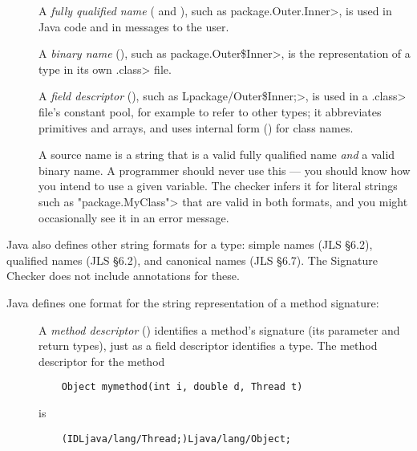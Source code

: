 \begin{description}

\item[]
  A \emph{fully qualified name} ( and ), such as
  \<package.Outer.Inner>, is used in Java code and in messages to
  the user.

\item[]
  A \emph{binary name} (), such as
  \<package.Outer\$Inner>, is
  the representation of a type in its own \<.class> file.

\item[]
  A \emph{field descriptor} (), such as
  \<Lpackage/Outer\$Inner;>, is used in a \<.class> file's constant pool,
  for example to refer to other types; it abbreviates primitives and
  arrays, and uses internal form () for class names.

\item[]
  A source name is a string that is a valid fully qualified name \emph{and}
  a valid binary name.  A programmer should never use this --- you should
  know how you intend to use a given variable.  The checker infers it for
  literal strings such as \<"package.MyClass"> that are valid in both
  formats, and you might occasionally see it in an error message.

\end{description}

Java also defines other string formats for a type: simple
names (JLS \S 6.2), qualified names (JLS \S 6.2), and canonical
names (JLS \S 6.7).  The Signature Checker does not include annotations
for these.


Java defines one format for the string representation of a method signature:

\begin{description}

\item[]
  A \emph{method descriptor} () identifies a method's signature (its parameter and return
  types), just as a field descriptor identifies a 
  type.   The method descriptor for the method
\begin{Verbatim}
    Object mymethod(int i, double d, Thread t)
\end{Verbatim}
\noindent is
\begin{Verbatim}
    (IDLjava/lang/Thread;)Ljava/lang/Object;
\end{Verbatim}

\end{description}


